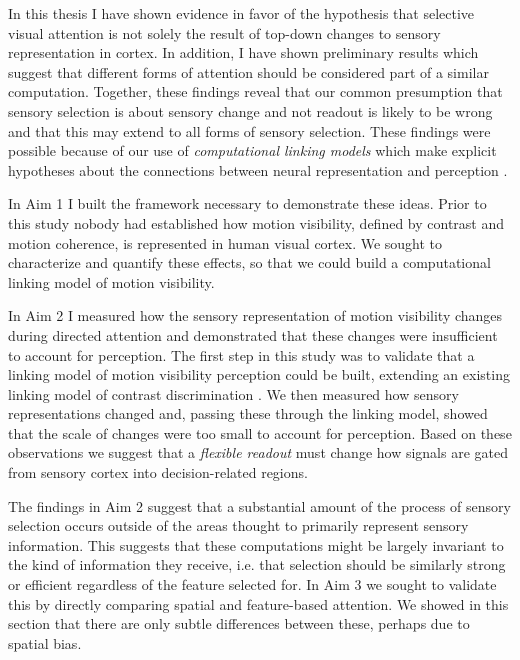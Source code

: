 
In this thesis I have shown evidence in favor of the hypothesis that selective visual attention is not solely the result of top-down changes to sensory representation in cortex. In addition, I have shown preliminary results which suggest that different forms of attention should be considered part of a similar computation. Together, these findings reveal that our common presumption that sensory selection is about sensory change and not readout is likely to be wrong and that this may extend to all forms of sensory selection. These findings were possible because of our use of \textit{computational linking models} which make explicit hypotheses about the connections between neural representation and perception \citep{Barlow1972-kz,Brindley1960-gq,Cohen2010-xs,Newsome1989-fr,Pestilli2011-gi}.

In Aim 1 I built the framework necessary to demonstrate these ideas. Prior to this study nobody had established how motion visibility, defined by contrast and motion coherence, is represented in human visual cortex. We sought to characterize and quantify these effects, so that we could build a computational linking model of motion visibility. 

In Aim 2 I measured how the sensory representation of motion visibility changes during directed attention and demonstrated that these changes were insufficient to account for perception. The first step in this study was to validate that a linking model of motion visibility perception could be built, extending an existing linking model of contrast discrimination \citep{Boynton1999-jd}. We then measured how sensory representations changed and, passing these through the linking model, showed that the scale of changes were too small to account for perception. Based on these observations we suggest that a \textit{flexible readout} must change how signals are gated from sensory cortex into decision-related regions.

The findings in Aim 2 suggest that a substantial amount of the process of sensory selection occurs outside of the areas thought to primarily represent sensory information. This suggests that these computations might be largely invariant to the kind of information they receive, i.e. that selection should be similarly strong or efficient regardless of the feature selected for. In Aim 3 we sought to validate this by directly comparing spatial and feature-based attention. We showed in this section that there are only subtle differences between these, perhaps due to spatial bias. 

